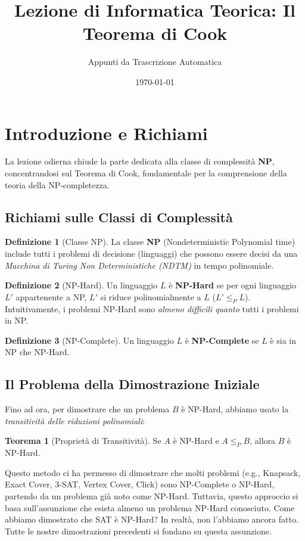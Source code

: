 \documentclass[a4paper]{article}
\title{Lezione di Informatica Teorica: Il Teorema di Cook}
\author{Appunti da Trascrizione Automatica}
\date{\today}
\theoremstyle{definition} %
\newtheorem{theorem}{Teorema}
\newtheorem{definition}{Definizione}
\begin{document}
\maketitle
\tableofcontents
\newpage

\section{Introduzione e Richiami}

La lezione odierna chiude la parte dedicata alla classe di complessità \textbf{NP}, concentrandosi sul Teorema di Cook, fondamentale per la comprensione della teoria della NP-completezza.

\subsection{Richiami sulle Classi di Complessità}

\begin{definition}[Classe NP]
La classe \textbf{NP} (Nondeterministic Polynomial time) include tutti i problemi di decisione (linguaggi) che possono essere decisi da una \emph{Macchina di Turing Non Deterministiche (NDTM)} in tempo polinomiale.
\end{definition}

\begin{definition}[NP-Hard]
Un linguaggio $L$ è \textbf{NP-Hard} se per ogni linguaggio $L'$ appartenente a NP, $L'$ si riduce polinomialmente a $L$ ($L' \le_P L$). Intuitivamente, i problemi NP-Hard sono \textit{almeno difficili quanto} tutti i problemi in NP.
\end{definition}

\begin{definition}[NP-Complete]
Un linguaggio $L$ è \textbf{NP-Complete} se $L$ è sia in NP che NP-Hard.
\end{definition}

\subsection{Il Problema della Dimostrazione Iniziale}
Fino ad ora, per dimostrare che un problema $B$ è NP-Hard, abbiamo usato la \emph{transitività delle riduzioni polinomiali}:
\begin{theorem}[Proprietà di Transitività]
Se $A$ è NP-Hard e $A \le_P B$, allora $B$ è NP-Hard.
\end{theorem}
Questo metodo ci ha permesso di dimostrare che molti problemi (e.g., Knapsack, Exact Cover, 3-SAT, Vertex Cover, Click) sono NP-Complete o NP-Hard, partendo da un problema già noto come NP-Hard.
Tuttavia, questo approccio si basa sull'assunzione che esista almeno un problema NP-Hard conosciuto. Come abbiamo dimostrato che SAT è NP-Hard? In realtà, non l'abbiamo ancora fatto. Tutte le nostre dimostrazioni precedenti si fondano su questa assunzione.
\end{document}
